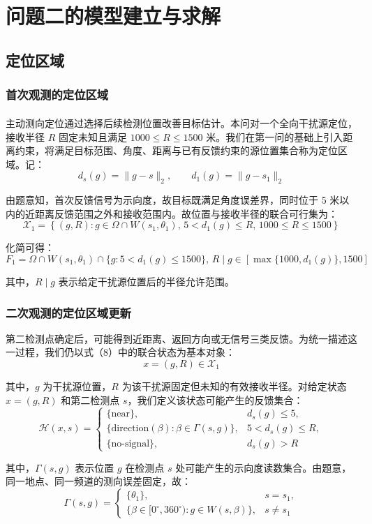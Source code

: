 \section{问题二的模型建立与求解}

\subsection{定位区域}

\subsubsection{首次观测的定位区域}

主动测向定位通过选择后续检测位置改善目标估计\textsuperscript{\cite{ref2}}。本问对一个全向干扰源定位，接收半径 \(R\) 固定未知且满足 \(1000\le R\le1500\) 米。我们在第一问的基础上引入距离约束，将满足目标范围、角度、距离与已有反馈约束的源位置集合称为定位区域。记：
\[
d_s(g)=\|g-s\|_2, \qquad d_1(g)=\|g-s_1\|_2
\]

由题意知，首次反馈信号为示向度，故目标既满足角度误差界，同时位于 5 米以内的近距离反馈范围之外和接收范围内。故位置与接收半径的联合可行集为：
\[
\mathcal X_1=
\left\{(g,R):
g\in\Omega\cap W(s_1,\theta_1),
\,
5<d_1(g)\le R,\,1000\le R\le1500
\right\}
\tag{8}
\]

化简可得：
\[
F_1=\Omega\cap W(s_1,\theta_1)\cap\{g:5<d_1(g)\le1500\},
\,
R\mid g\in[\max\{1000,d_1(g)\},1500]
\tag{9}
\]

其中，\(R\mid g\) 表示给定干扰源位置后的半径允许范围。

\subsubsection{二次观测的定位区域更新}

第二检测点确定后，可能得到近距离、返回方向或无信号三类反馈。为统一描述这一过程，我们仍以式（8）中的联合状态为基本对象：
\[
x=(g,R)\in\mathcal X_1
\]

其中，\(g\) 为干扰源位置，\(R\) 为该干扰源固定但未知的有效接收半径。对给定状态 \(x=(g,R)\) 和第二检测点 \(s\)，我们定义该状态可能产生的反馈集合：
\[
\mathcal H(x,s)=
\begin{cases}
\{\text{near}\},&d_s(g)\le5,\\[2mm]
\{\text{direction}(\beta):\beta\in\Gamma(s,g)\},&5<d_s(g)\le R,\\[2mm]
\{\text{no-signal}\},&d_s(g)>R
\end{cases}
\tag{10}
\]

其中，\(\Gamma(s,g)\) 表示位置 \(g\) 在检测点 \(s\) 处可能产生的示向度读数集合。由题意，同一地点、同一频道的测向误差固定，故：
\[
\Gamma(s,g)=
\begin{cases}
\{\theta_1\},&s=s_1,\\[2mm]
\{\beta\in[0^\circ,360^\circ):g\in W(s,\beta)\},&s\ne s_1
\end{cases}
\tag{11}
\]

